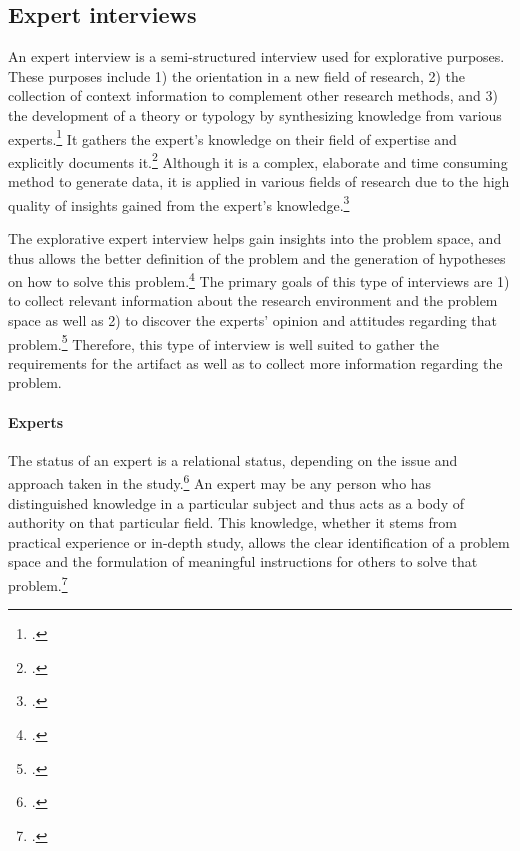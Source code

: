 \subsection{Expert interviews} \label{subsec:ExpertInterviews}
An expert interview is a semi-structured interview used for explorative purposes. These purposes include 1) the orientation in a new field of research, 2) the collection of context information to complement other research methods, and 3) the development of a theory or typology by synthesizing knowledge from various experts.\footcite[Cf.][p.450]{PfadenhauerExperteninterviewGesprachauf2007} It gathers the expert's knowledge on their field of expertise and explicitly documents it.\footcites[cf.][p.172]{HickeyElicitationtechniqueselection2003} Although it is a complex, elaborate and time consuming method to generate data, it is applied in various fields of research due to the high quality of insights gained from the expert's knowledge.\footcites[Cf.][p.459]{PfadenhauerExperteninterviewGesprachauf2007}[cf.][p.442]{MeuserExpertInneninterviewsvielfacherprobt1991}[cf.][p.424]{BuberQualitativeMarktforschungKonzepte2007}[cf.][p.179]{Flickintroductionqualitativeresearch2009}[cf.][p.465]{MeuserExperteninterviewkonzeptionelleGrundlagen2009}[cf.][p.31]{BognerInterviewsmitExperten2014}

The explorative expert interview helps gain insights into the problem space, and thus allows the better definition of the problem and the generation of hypotheses on how to solve this problem.\footcite[Cf.][p.28]{BognerInterviewsmitExperten2014} The primary goals of this type of interviews are 1) to collect relevant information about the research environment and the problem space as well as 2) to discover the experts' opinion and attitudes regarding that problem.\footcite[Cf.][pp.28/29]{BognerInterviewsmitExperten2014} Therefore, this type of interview is well suited to gather the requirements for the artifact as well as to collect more information regarding the problem.

\paragraph{Experts} The status of an expert is a relational status, depending on the issue and approach taken in the study.\footcites[Cf.][p.179]{Flickintroductionqualitativeresearch2009}[cf.][p.444]{MeuserExpertInneninterviewsvielfacherprobt1991} An expert may be any person who has distinguished knowledge in a particular subject and thus acts as a body of authority on that particular field. This knowledge, whether it stems from practical experience or in-depth study, allows the clear identification of a problem space and the formulation of meaningful instructions for others to solve that problem.\footcites[Cf.][p.469]{MeuserExpertInneninterviewsvielfacherprobt1991}[cf.][p.467]{MeuserExperteninterviewkonzeptionelleGrundlagen2009}[cf.][p.179]{Flickintroductionqualitativeresearch2009}[cf.][p.451]{PfadenhauerExperteninterviewGesprachauf2007}[cf.][p.19]{BognerInterviewsmitExperten2014}

